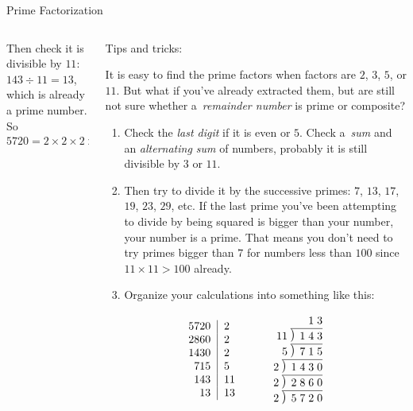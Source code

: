\documentclass[9pt,aspectratio=169]{beamer}
\newcommand\Mydiv[2]{%
$\strut#1$\kern.25em\smash{\raise.3ex\hbox{$\big)$}}$\mkern-8mu
        \overline{\enspace\strut#2}$}
\begin{document}
\begin{frame}{Prime Factorization}
\begin{columns}[T]
\begin{column}{0.5\textwidth}
{      Then check it is divisible by $11$: $143 \div 11 = 13$, which is already a prime number. So}
      \[ 5720 = 2 \times 2 \times 2 \times 5 \times 11 \times 13 = 2^3 \times 5 \times 11 \times 13.\]
    \end{column}
    \begin{column}{0.5\textwidth}
      {\color{textBlue} Tips and tricks:}
      {\small
      It is easy to find the prime factors when factors are $2$, $3$, $5$, or $11$. But what if you've already extracted them, but are still not sure whether a~\emph{remainder number} is prime or composite?
      \begin{enumerate}
        \item Check the \emph{last digit} if it is even or $5$. Check a~\emph{sum} and an \emph{alternating sum} of numbers, probably it is still divisible by $3$ or $11$.
        \item Then try to divide it by the successive primes: $7$, $13$, $17$, $19$, $23$, $29$, etc. If the last prime you've been attempting to divide by being squared is bigger than your number, your number is a prime. That means you don't need to try primes bigger than $7$ for numbers less than $100$ since $11 \times 11 > 100$ already.
        \item Organize your calculations into something like this:
      \end{enumerate}\vspace*{-0.5ex}
      \[
        \begin{tabular}{c c}
          \begin{tabular}{r|l}
            5720 & 2 \\
            2860 & 2 \\
            1430 & 2 \\
             715 & 5 \\
             143 & 11 \\
              13 & 13 \\
          \end{tabular} 
          & \quad
          \begin{tabular}{r}
            1\;3\\\
            \Mydiv{11}{\ 1\;4\;3}\\
            \Mydiv{5}{\ 7\;1\;5}\\
            \Mydiv{2}{\ 1\;4\;3\;0}\\
            \Mydiv{2}{\ 2\;8\;6\;0}\\
            \Mydiv{2}{\ 5\;7\;2\;0}
          \end{tabular}
        \end{tabular}
      \]
      }
    \end{column}
  \end{columns}
\end{frame}
\end{document}
